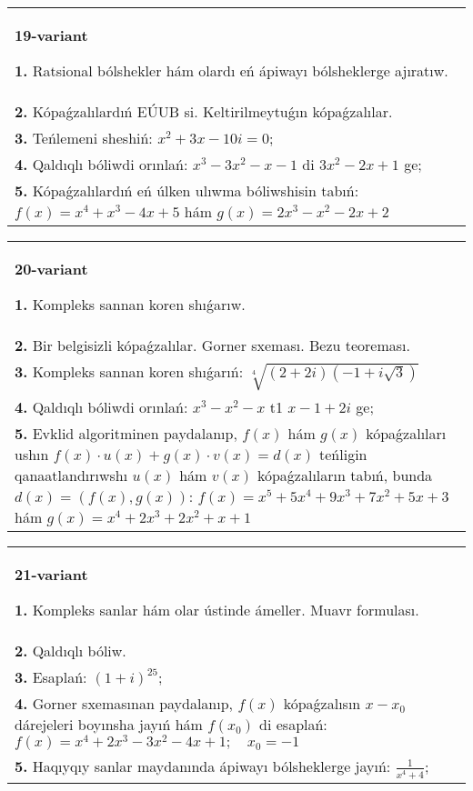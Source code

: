\documentclass{article}
\begin{document}
\begin{tabular}{m{17cm}}
\textbf{19-variant}
\newline

\textbf{1.} Ratsional bólshekler hám olardı eń ápiwayı bólsheklerge ajıratıw. \\
\textbf{2.} Kópaǵzalılardıń EÚUB si. Keltirilmeytuǵın   kópaǵzalılar. \\
\textbf{3.} Teńlemeni sheshiń:  $x^2+3 x-10 i=0$; \\
\textbf{4.} Qaldıqlı bóliwdi orınlań: $x^3-3 x^2-x-1$ di $3 x^2-2 x+1$ ge; \\
\textbf{5.} Kópaǵzalılardıń eń úlken ulıwma bóliwshisin tabıń:  $f(x)=x^4+x^3-4 x+5$ hám $g(x)=2 x^3-x^2-2 x+2$ \\

\end{tabular}
\vspace{1cm}


\begin{tabular}{m{17cm}}
\textbf{20-variant}
\newline

\textbf{1.} Kompleks sannan koren shıǵarıw. \\
\textbf{2.} Bir belgisizli kópaǵzalılar. Gorner sxeması. Bezu teoreması.  \\
\textbf{3.} Kompleks sannan koren shıǵarıń: $\sqrt[4]{(2+2 i)(-1+i \sqrt{3})}$ \\
\textbf{4.} Qaldıqlı bóliwdi orınlań:  $x^3-x^2-x$ t1 $x-1+2 i$ ge; \\
\textbf{5.} Evklid algoritminen paydalanıp, $f(x)$ hám $g(x)$ kópaǵzalıları ushın $f(x) \cdot u(x)+g(x) \cdot v(x)=d(x)$ teńligin qanaatlandırıwshı $u(x)$ hám $v(x)$ kópaǵzalıların tabıń, bunda $d(x)=(f(x), g(x))$:  $f(x)=x^5+5 x^4+9 x^3+7 x^2+5 x+3$ hám $g(x)=x^4+2 x^3+2 x^2+x+1$ \\

\end{tabular}
\vspace{1cm}


\begin{tabular}{m{17cm}}
\textbf{21-variant}
\newline

\textbf{1.} Kompleks sanlar hám olar ústinde ámeller. Muavr formulası.  \\
\textbf{2.} Qaldıqlı bóliw.  \\
\textbf{3.} Esaplań:  $(1+i)^{25}$; \\
\textbf{4.} Gorner sxemasınan paydalanıp, $f(x)$ kópaǵzalısın $x-x_0$ dárejeleri boyınsha jayıń hám $f\left(x_0\right)$ di esaplań: $f(x)=x^4+2 x^3-3 x^2-4 x+1 ; \quad x_0=-1$ \\
\textbf{5.} Haqıyqıy sanlar maydanında ápiwayı bólsheklerge jayıń:  $\frac{1}{x^4+4}$; \\

\end{tabular}
\vspace{1cm}
\end{document}
